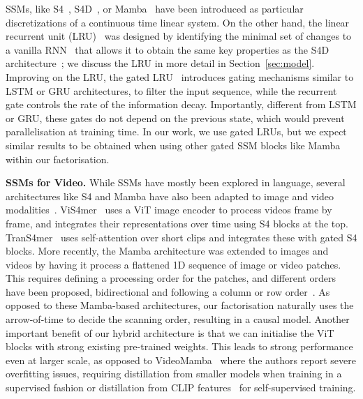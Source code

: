 SSMs, like S4~\cite{gu2021efficiently}, S4D~\cite{gu2022parameterization}, or Mamba~\cite{gu2023mamba} have been introduced as particular discretizations of a continuous time linear system. On the other hand, the linear recurrent unit (LRU)~\cite{orvieto2023resurrecting} was designed by identifying the minimal set of changes to a vanilla RNN~\cite{elman1990finding} that allows it to obtain the same key properties as the S4D architecture~\citep{gu2021efficiently}; we discuss the LRU in more detail in Section~\ref{sec:model}. Improving on the LRU, the gated LRU~\cite{de2024griffinmixinggatedlinear} introduces gating mechanisms similar to LSTM or GRU architectures, to filter the input sequence, while the recurrent gate controls the rate of the information decay. Importantly, different from LSTM or GRU, these gates do not depend on the previous state, which would prevent parallelisation at training time.
In our work, we use gated LRUs, but we expect similar results to be obtained when using other gated SSM blocks like Mamba within our factorisation.

\vspace{1mm}


\noindent\textbf{SSMs for Video.} While SSMs have mostly been explored in language, several architectures like S4 and Mamba have also been adapted to image and video modalities~\cite{surveyvmamba}. ViS4mer~\cite{Islam2022LongMC} uses a ViT image encoder to process videos frame by frame, and integrates their representations over time using S4 blocks at the top.  TranS4mer~\cite{10204597} uses self-attention over short clips and integrates these with gated S4 blocks. More recently, the Mamba architecture was extended to images and videos by having it process a flattened 1D sequence of image or video patches. This requires defining a processing order for the patches, and different orders have been proposed, \eg bidirectional and following a column or row order~\cite{zhu2024vision,li2024videomambastatespacemodel}. As opposed to these Mamba-based architectures, our factorisation naturally uses the arrow-of-time to decide the scanning order, resulting in a causal model. Another important benefit of our hybrid architecture is that we can initialise the ViT blocks with strong existing pre-trained weights. This leads to strong performance even at larger scale, as opposed to VideoMamba~\cite{li2024videomambastatespacemodel} where the authors report severe overfitting issues, requiring distillation from smaller models when training in a supervised fashion or distillation from CLIP features~\cite{clip} for self-supervised training.    